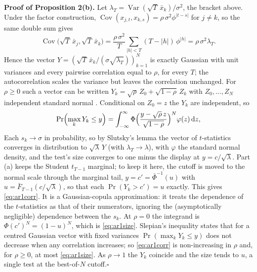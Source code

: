 \medskip\noindent\textbf{Proof of Proposition 2(b).} Let $\lambda_T=\operatorname{Var}(\sqrt T\,\bar x_k)/\sigma^2$, the bracket above. Under the factor construction, $\operatorname{Cov}(x_{j,t},x_{k,s})=\rho\,\sigma^2\phi^{|t-s|}$ for $j\ne k$, so the same double sum gives
\[
\operatorname{Cov}\bigl(\sqrt T\,\bar x_j,\sqrt T\,\bar x_k\bigr)=\frac{\rho\,\sigma^2}{T}\sum_{|h|<T}(T-|h|)\,\phi^{|h|}=\rho\,\sigma^2\lambda_T .
\]
Hence the vector $Y=(\sqrt T\,\bar x_k/(\sigma\sqrt{\lambda_T}))_{k=1}^N$ is exactly Gaussian with unit variances and every pairwise correlation equal to $\rho$, for every $T$; the autocorrelation scales the variance but leaves the correlation unchanged. For $\rho\ge0$ such a vector can be written $Y_k=\sqrt\rho\,Z_0+\sqrt{1-\rho}\,Z_k$ with $Z_0,\dots,Z_N$ independent standard normal \citep[Ch.~8]{tong1990multivariate}. Conditional on $Z_0=z$ the $Y_k$ are independent, so
\[
\Pr\Bigl(\max_kY_k\le y\Bigr)=\int_{-\infty}^{\infty}\Phi\Bigl(\frac{y-\sqrt\rho\,z}{\sqrt{1-\rho}}\Bigr)^N\varphi(z)\,\mathrm dz ,
\]
Each $s_k\to\sigma$ in probability, so by Slutsky's lemma the vector of $t$-statistics converges in distribution to $\sqrt\lambda\,Y$ (with $\lambda_T\to\lambda$), with $\varphi$ the standard normal density, and the test's size converges to one minus the display at $y=c/\sqrt\lambda$. Part (a) keeps the Student $t_{T-1}$ marginal; to keep it here, the cutoff is moved to the normal scale through the marginal tail, $y=c'=\bar\Phi^{-1}(u)$ with $u=\bar F_{T-1}(c/\sqrt\lambda)$, so that each $\Pr(Y_k>c')=u$ exactly. This gives \eqref{eq:ar1corr}. It is a Gaussian-copula approximation: it treats the dependence of the $t$-statistics as that of their numerators, ignoring the (asymptotically negligible) dependence between the $s_k$. At $\rho=0$ the integrand is $\Phi(c')^N=(1-u)^N$, which is \eqref{eq:ar1size}. Slepian's inequality \citep{slepian1962one} states that for a centred Gaussian vector with fixed variances $\Pr(\max_kY_k\le y)$ does not decrease when any correlation increases; so \eqref{eq:ar1corr} is non-increasing in $\rho$ and, for $\rho\ge0$, at most \eqref{eq:ar1size}. As $\rho\to1$ the $Y_k$ coincide and the size tends to $u$, a single test at the best-of-$N$ cutoff.\hfill$\square$
